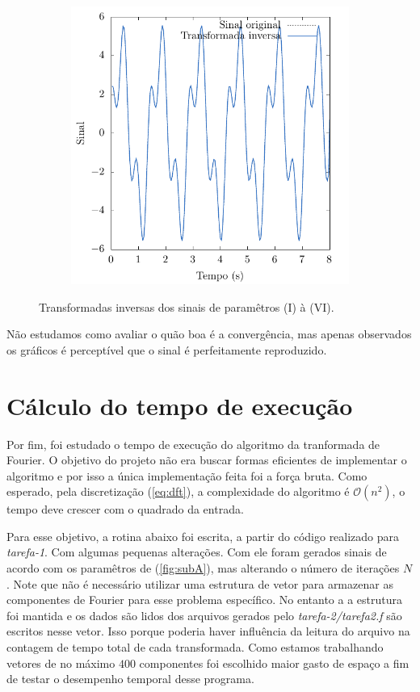 \documentclass[a4paper, 11pt]{article}
\begin{document}
\begin{figure}[h!]
\begin{subfigure}{0.40\textwidth}
    \end{subfigure}
    \begin{subfigure}{0.40\textwidth}
        \centering
        \includegraphics[width=\textwidth]{inv-dft-F}
    \end{subfigure}
    \caption{Transformadas inversas dos sinais de paramêtros (I) à (VI).}
\end{figure}


Não estudamos como avaliar o quão boa é a convergência, mas apenas observados os gráficos é
perceptível que o sinal é perfeitamente reproduzido.

\clearpage
\section{Cálculo do tempo de execução}

Por fim, foi estudado o tempo de execução do algoritmo da tranformada de Fourier. O objetivo do
projeto não era buscar formas eficientes de implementar o algoritmo e por isso a única implementação
feita foi a força bruta. Como esperado, pela discretização (\ref{eq:dft}), a complexidade do
algoritmo é \( \mathcal{O}(n^2) \), o tempo deve crescer com o quadrado da entrada.

Para esse objetivo, a rotina abaixo foi escrita, a partir do código realizado para
\emph{tarefa-1}. Com algumas pequenas alterações. Com ele foram gerados sinais de acordo
com os paramêtros de (\ref{fig:subA}), mas alterando o número de iterações $N$.
Note que não é necessário utilizar uma estrutura de vetor para armazenar as componentes de Fourier
para esse problema específico. No entanto a a estrutura foi mantida e os dados são lidos dos
arquivos gerados pelo \emph{tarefa-2/tarefa2.f} são escritos nesse vetor. Isso porque poderia haver
influência da leitura do arquivo na contagem de tempo total de cada transformada. Como estamos
trabalhando vetores de no máximo $400$ componentes foi escolhido maior gasto de espaço a fim de
testar o desempenho temporal desse programa.
\end{document}
